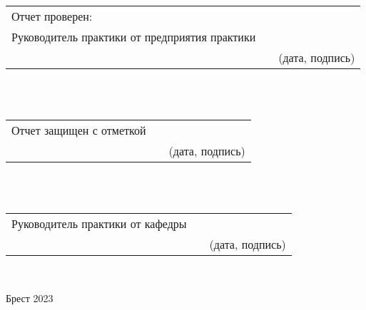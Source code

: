 \noindent
\begin{tabular}{lp{3em}l} 
    Отчет проверен: \\
    Руководитель практики от предприятия практики & \hspace{1 mm} \\\cline{2-3} 
    \hspace{4  cm}    && \footnotesize{(дата, подпись)}
\end{tabular} \\ \\

\noindent
\begin{tabular}{lp{13.5em}l} 
    Отчет защищен с отметкой  & \hspace{ 5mm} \\\cline{2-3} 
    \hspace{3  cm}    && \footnotesize{(дата, подпись)}
\end{tabular} \\ \\

\noindent
\begin{tabular}{lp{9em}l} 
    Руководитель практики от кафедры   && \\\cline{2-3} 
    \hspace{1  cm}    && \footnotesize{(дата, подпись)}
\end{tabular} \\ 
\vspace{3 cm}

\begin{center}
    Брест 2023
\end{center}
    

                                                                    





